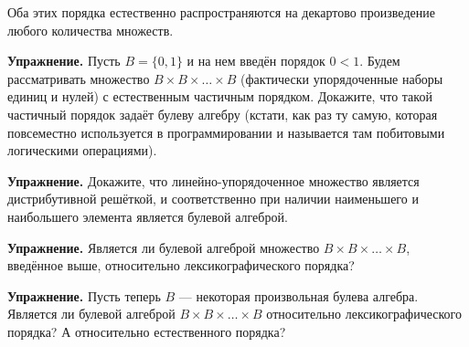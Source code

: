 Оба этих порядка естественно распространяются на декартово произведение любого количества множеств.

{\bfseries Упражнение.} Пусть $B = \{0, 1\}$ и на нем введён порядок $0 < 1$. Будем рассматривать множество $B\times B\times \ldots \times B$ (фактически упорядоченные наборы единиц и нулей) с естественным частичным порядком. Докажите, что такой частичный порядок задаёт булеву алгебру (кстати, как раз ту самую, которая повсеместно используется в программировании и называется там побитовыми логическими операциями).

{\bfseries Упражнение.} Докажите, что линейно-упорядоченное множество является дистрибутивной решёткой, и соответственно при наличии наименьшего и наибольшего элемента является булевой алгеброй.

{\bfseries Упражнение.} Является ли булевой алгеброй множество $B\times B \times \ldots \times B$, введённое выше, относительно лексикографического порядка?

{\bfseries Упражнение.} Пусть теперь $B$ — некоторая произвольная булева алгебра. Является ли булевой алгеброй $B\times B \times \ldots \times B$ относительно лексикографического порядка? А относительно естественного порядка?

